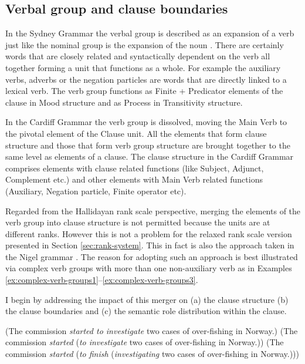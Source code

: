 \subsection{Verbal group and clause boundaries}
\label{sec:verbal-grpoup-and-clause-division}
    In the Sydney Grammar the verbal group is described as an expansion of a verb just like the nominal group is the expansion of the noun \citep[396]{Halliday2013}. There are certainly words that are closely related and syntactically dependent on the verb all together forming a unit that functions as a whole. For example the auxiliary verbs, adverbs or the negation particles are words that are directly linked to a lexical verb. The verb group functions as Finite + Predicator elements of the clause in Mood structure and as Process in Transitivity structure. 
    
    In the Cardiff Grammar the verb group is dissolved, moving the Main Verb to the pivotal element of the Clause unit. All the elements that form clause structure and those that form verb group structure are brought together to the same level as elements of a clause. The clause structure in the Cardiff Grammar comprises elements with clause related functions (like Subject, Adjunct, Complement etc.) and other elements with Main Verb related functions (Auxiliary, Negation particle, Finite operator etc).
    
    Regarded from the Hallidayan rank scale perspective, merging the elements of the verb group into clause structure is not permitted because the units are at different ranks. However this is not a problem for the relaxed rank scale version presented in Section \ref{sec:rank-system}. This in fact is also the approach taken in the Nigel grammar \citep{Nigel-Manual}. The reason for adopting such an approach is best illustrated via complex verb groups with more than one non-auxiliary verb as in Examples \ref{ex:complex-verb-groups1}--\ref{ex:complex-verb-groups3}. 
    
    I begin by addressing the impact of this merger on (a) the clause structure (b) the clause boundaries and (c) the semantic role distribution within the clause.

    \begin{exe}
    	\ex\label{ex:complex-verb-groups1}
    	(The commission \textit{started to investigate} two cases of over-fishing in Norway.)  
    	\ex\label{ex:complex-verb-groups2}
    	(The commission \textit{started} (\textit{to investigate} two cases of over-fishing in Norway.))
    	\ex\label{ex:complex-verb-groups3}
    	(The commission \textit{started} (\textit{to finish} (\textit{investigating} two cases of over-fishing in Norway.)))
    \end{exe}
    
